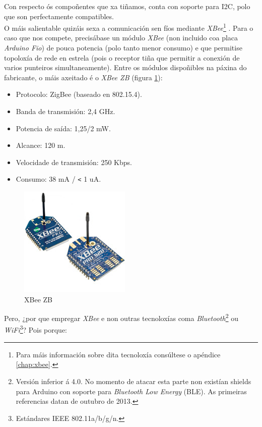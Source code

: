   Con respecto ós compoñentes que xa tiñamos, conta con soporte para I2C, polo
  que son perfectamente compatibles. \\

  O máis salientable quizáis sexa a comunicación sen fíos mediante
  \textit{XBee}\footnote{Para máis información sobre dita tecnoloxía consúltese
  o apéndice \ref{chap:xbee}.} \cite{Xbee}. Para o caso que nos compete,
  precisábase un módulo \textit{XBee} (non incluido coa placa
  \textit{Arduino Fio}) de pouca potencia (polo tanto menor consumo) e que
  permitise topoloxía de rede en estrela (pois o receptor tiña que permitir a
  conexión de varios punteiros simultaneamente). Entre os módulos dispoñibles
  na páxina do fabricante, o máis axeitado é o \textit{XBee ZB} \cite{XbeeZB}
  (figura \ref{figura:XBeeZB}):

  \begin{itemize}
   \item Protocolo: ZigBee (baseado en 802.15.4).
   \item Banda de transmisión: 2,4 GHz.
   \item Potencia de saída: 1,25/2 mW.
   \item Alcance: 120 m.
   \item Velocidade de transmisión: 250 Kbps.
   \item Consumo: 38 mA / \verb|<| 1 uA.
  \end{itemize}

  \begin{figure}[htbp]
   \centering
   \includegraphics[scale=0.6,keepaspectratio=true]{./imagenes/xbee-zb.jpg}
   \caption{XBee ZB}
   \label{figura:XBeeZB}
  \end{figure}

  Pero, ¿por que empregar \textit{XBee} e non outras tecnoloxías coma
  \textit{Bluetooth}\footnote{Versión inferior á 4.0. No momento de atacar esta
  parte non existían shields para Arduino con soporte para
  \textit{Bluetooth Low Energy} (BLE). As primeiras referencias datan de
  outubro de 2013.} ou
  \textit{WiFi}\footnote{Estándares IEEE 802.11a/b/g/n.}? Pois porque:

